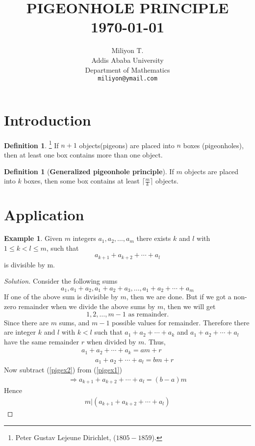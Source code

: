 \documentclass{article}
\title{	\normalsize \textsc{} 									%
			\LARGE \textbf{\uppercase{Pigeonhole Principle}}	%
			\HRule{1pt} \\ [0.5cm]								%
			\normalsize \today									%
		}
\author{
		Miliyon T.\\	
		Addis Ababa University\\	
		Department of Mathematics\\
        \texttt{miliyon@ymail.com} \\
}
\theoremstyle{definition}
\newtheorem{defn}[thm]{Definition}
\newtheorem{exmp}[thm]{Example}
\theoremstyle{remark}
\begin{document}
\maketitle

\section{Introduction}
\begin{defn}\footnote{Peter Gustav Lejeune Dirichlet, ($1805 - 1859$).}
If $n+1$ objects(pigeons) are placed into $n$ boxes (pigeonholes), then at least one box contains more than one object.
\end{defn}

\begin{defn}[\textbf{Generalized pigeonhole principle}]
If $m$ objects are placed into $k$ boxes, then some box contains at least $\lceil\frac{m}{k}\rceil$ objects.
\end{defn}
\section{Application}

\begin{exmp}
Given $m$ integers $a_1,a_2,\ldots,a_m$ there exists $k$ and $l$ with $1\leq k<l\leq m$, such that
\[a_{k+1}+a_{k+2}+\cdots+a_l\]
is divisible by m.
\end{exmp}
\begin{proof}[Solution]
Consider the following sums
\[a_1,a_1+a_2,a_1+a_2+a_3, \ldots , a_1+a_2+\cdots+a_m \]
If one of the above sum is divisible by $m$, then we are done. But if we got a non-zero remainder when we divide the above sums by $m$, then we will get
\[1,2,\ldots , m-1 \text{ as remainder.}\]
Since there are $m$ sums, and $m-1$ possible values for remainder. Therefore there are integer $k$ and $l$ with $k<l$ such that $a_1+a_2+\cdots+a_k$ and $a_1+a_2+\cdots+a_l$ have the same remainder $r$ when divided by $m$. Thus,
\begin{align}
a_1+a_2+\cdots+a_k=am+r \label{pigex1}\\
\qquad a_1+a_2+\cdots+a_l=bm+r\label{pigex2}
\end{align}
Now subtract (\ref{pigex2}) from (\ref{pigex1})
\begin{align*}
\Rightarrow a_{k+1}+a_{k+2}+\cdots+a_l=(b-a)m
\end{align*}
Hence
\begin{align*}
m|(a_{k+1}+a_{k+2}+\cdots+a_l)
\end{align*}
\end{proof}
\end{document}
